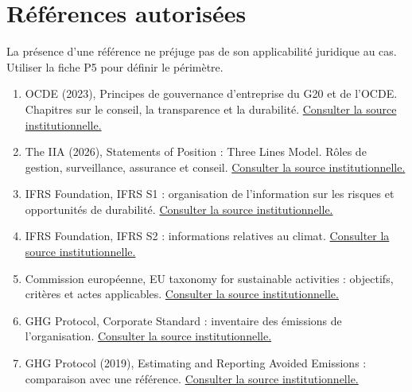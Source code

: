 \documentclass[11pt,a4paper]{article}
\begin{document}
\section{Références autorisées}
La présence d’une référence ne préjuge pas de son applicabilité juridique au cas. Utiliser la fiche P5 pour définir le périmètre.
\begin{enumerate}
\item OCDE (2023), Principes de gouvernance d’entreprise du G20 et de l’OCDE. Chapitres sur le conseil, la transparence et la durabilité. \href{https://doi.org/10.1787/734e2284-fr}{Consulter la source institutionnelle.}
\item The IIA (2026), Statements of Position : Three Lines Model. Rôles de gestion, surveillance, assurance et conseil. \href{https://www.theiia.org/en/resources/statements-of-position}{Consulter la source institutionnelle.}
\item IFRS Foundation, IFRS S1 : organisation de l’information sur les risques et opportunités de durabilité. \href{https://www.ifrs.org/issued-standards/ifrs-sustainability-standards-navigator/ifrs-s1-general-requirements/}{Consulter la source institutionnelle.}
\item IFRS Foundation, IFRS S2 : informations relatives au climat. \href{https://www.ifrs.org/supporting-implementation/supporting-materials-for-ifrs-sustainability-disclosure-standards/ifrs-s2/}{Consulter la source institutionnelle.}
\item Commission européenne, EU taxonomy for sustainable activities : objectifs, critères et actes applicables. \href{https://finance.ec.europa.eu/sustainable-finance/tools-and-standards/eu-taxonomy-sustainable-activities_en}{Consulter la source institutionnelle.}
\item GHG Protocol, Corporate Standard : inventaire des émissions de l’organisation. \href{https://ghgprotocol.org/corporate-standard}{Consulter la source institutionnelle.}
\item GHG Protocol (2019), Estimating and Reporting Avoided Emissions : comparaison avec une référence. \href{https://ghgprotocol.org/estimating-and-reporting-avoided-emissions}{Consulter la source institutionnelle.}
\end{enumerate}
\end{document}
